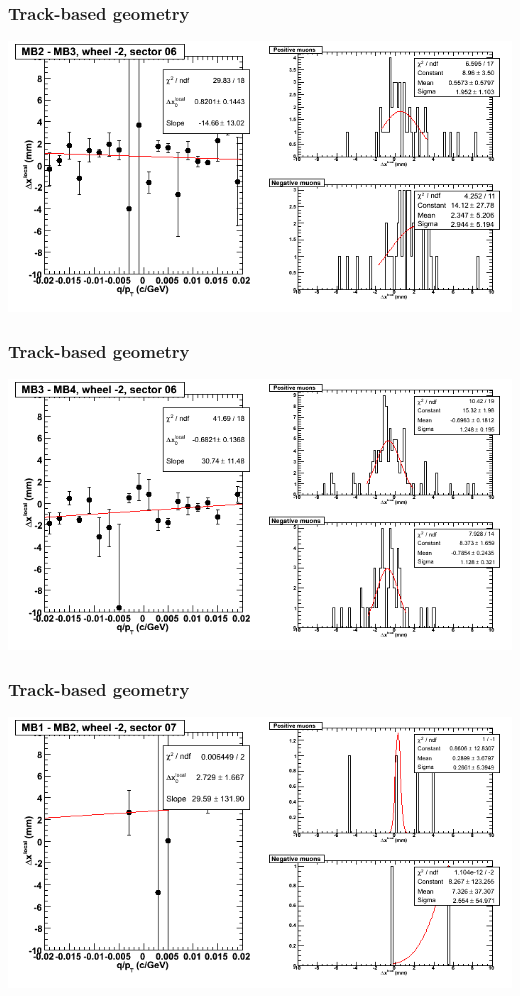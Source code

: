 \documentclass[compress]{beamer}
\begin{document}
\begin{frame}
\frametitle{Track-based geometry}
\includegraphics[width=\linewidth]{NOV4_segdiffs/dt13_resid_A_06_23.png}
\end{frame}

\begin{frame}
\frametitle{Track-based geometry}
\includegraphics[width=\linewidth]{NOV4_segdiffs/dt13_resid_A_06_34.png}
\end{frame}

\begin{frame}
\frametitle{Track-based geometry}
\includegraphics[width=\linewidth]{NOV4_segdiffs/dt13_resid_A_07_12.png}
\end{frame}
\end{document}
